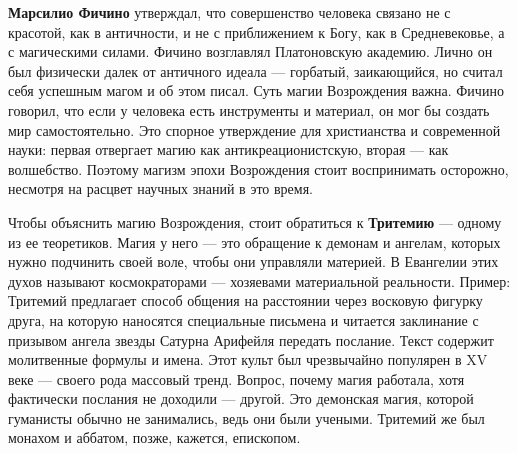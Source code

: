 
\textbf{Марсилио Фичино} утверждал, что совершенство человека связано не с красотой, как в античности, и не с приближением к Богу, как в Средневековье, а с магическими силами. Фичино возглавлял Платоновскую академию. Лично он был физически далек от античного идеала --- горбатый, заикающийся, но считал себя успешным магом и об этом писал.
Суть магии Возрождения важна. Фичино говорил, что если у человека есть инструменты и материал, он мог бы создать мир самостоятельно. Это спорное утверждение для христианства и современной науки: первая отвергает магию как антикреационистскую, вторая --- как волшебство. Поэтому магизм эпохи Возрождения стоит воспринимать осторожно, несмотря на расцвет научных знаний в это время.

Чтобы объяснить магию Возрождения, стоит обратиться к \textbf{Тритемию} --- одному из ее теоретиков. Магия у него --- это обращение к демонам и ангелам, которых нужно подчинить своей воле, чтобы они управляли материей. В Евангелии этих духов называют космократорами --- хозяевами материальной реальности.
Пример: Тритемий предлагает способ общения на расстоянии через восковую фигурку друга, на которую наносятся специальные письмена и читается заклинание с призывом ангела звезды Сатурна Арифейля передать послание. Текст содержит молитвенные формулы и имена. Этот культ был чрезвычайно популярен в XV веке --- своего рода массовый тренд.
Вопрос, почему магия работала, хотя фактически послания не доходили --- другой. Это демонская магия, которой гуманисты обычно не занимались, ведь они были учеными. Тритемий же был монахом и аббатом, позже, кажется, епископом.



